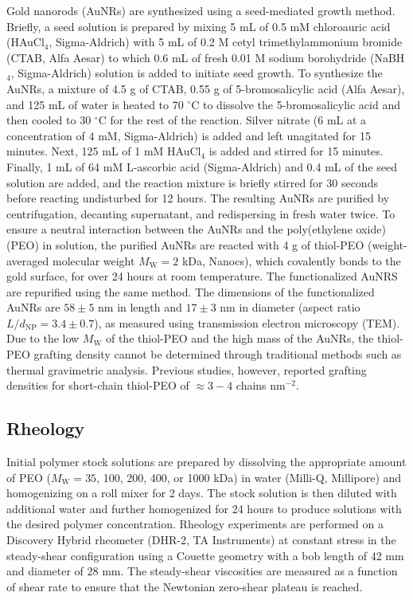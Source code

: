 \documentclass[journal=jacsat, superscriptaddress]{achemso}
\def\EDITS#1{{\color{black}#1}}
\def\EDITS#1{#1}
\def\EDITSJCC#1{{\color{black}#1}}
\def\EDITSJCC#1{#1}
\begin{document}
Gold nanorods (AuNRs) are synthesized using a seed-mediated growth method.\cite{Ye2012} Briefly, a seed solution is prepared by mixing 5 mL of 0.5 mM chloroauric acid (HAuCl$_4$, Sigma-Aldrich) with 5 mL of 0.2 M cetyl trimethylammonium bromide (CTAB, Alfa Aesar) to which 0.6 mL of fresh 0.01 M sodium borohydride (NaBH$_4$, Sigma-Aldrich) solution is added to initiate seed growth. To synthesize the AuNRs, a mixture of 4.5 g of CTAB, 0.55 g of 5-bromosalicylic acid (Alfa Aesar), and 125 mL of water is heated to 70 $^\circ$C to dissolve the 5-bromosalicylic acid and then cooled to 30 $^\circ$C for the rest of the reaction. Silver nitrate (6 mL \EDITS{at a concentration of 4 mM}, Sigma-Aldrich) is added and left unagitated for 15 minutes. Next, 125 mL of 1 mM HAuCl$_4$ is added and stirred for 15 minutes. Finally, 1 mL of \EDITS{64 mM} L-ascorbic acid (Sigma-Aldrich) and 0.4 mL of the seed solution are added, and the reaction mixture is briefly stirred for 30 seconds before reacting undisturbed for 12 hours. The resulting AuNRs are purified by centrifugation, decanting supernatant, and redispersing in fresh water twice. To ensure a neutral interaction between the AuNRs and the poly(ethylene oxide) (PEO) in solution, the purified AuNRs are reacted with 4 g of thiol-PEO (weight-averaged molecular weight $M_\mathrm{W} = 2$ kDa, Nanocs), which covalently bonds to the gold surface, for over 24 hours at room temperature. The functionalized AuNRS are repurified using the same method. The dimensions of the functionalized AuNRs are $58 \pm 5$ nm in length and $17 \pm 3$ nm in diameter (aspect ratio $L/d_\mathrm{NP} = 3.4 \pm 0.7$), as measured using transmission electron microscopy (TEM). \EDITS{Due to the low $M_\mathrm{W}$ of the thiol-PEO and the high mass of the AuNRs, the thiol-PEO grafting density cannot be determined through traditional methods such as thermal gravimetric analysis. Previous studies,\cite{Harder1998,Rahme2013} however, \EDITSJCC{reported} grafting densities for short-chain thiol-PEO \EDITSJCC{of} $\approx 3-4$ chains nm$^{-2}$.  }

\subsection{\small Rheology}

Initial polymer stock solutions are prepared by dissolving the appropriate amount of PEO ($M_\mathrm{W} = 35$, 100, 200, 400, or 1000 kDa) in water (Milli-Q, Millipore) and homogenizing on a roll mixer for 2 days. The stock solution is then diluted with additional water and further homogenized for 24 hours to produce solutions with the desired polymer concentration. Rheology experiments are performed on a Discovery Hybrid rheometer (DHR-2, TA Instruments) at constant stress in the steady-shear configuration using a Couette geometry with a bob length of 42 mm and diameter of 28 mm. The steady-shear viscosities are measured as a function of shear rate to ensure that the Newtonian zero-shear plateau is reached. 
\end{document}
